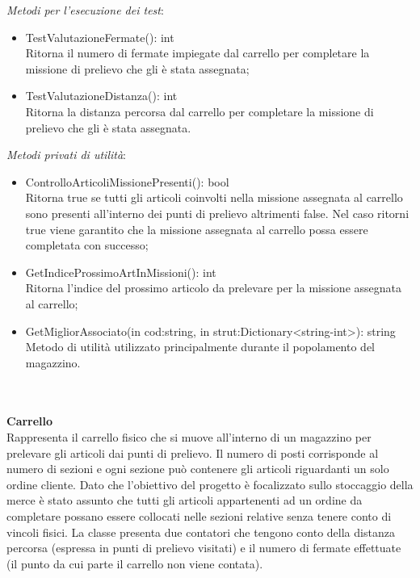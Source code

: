 \textit{Metodi per l'esecuzione dei test}:
\begin{itemize}
    \item TestValutazioneFermate(): int\\
    Ritorna il numero di fermate impiegate dal carrello per completare la missione di prelievo che gli è stata assegnata;
    \item TestValutazioneDistanza(): int\\
    Ritorna la distanza percorsa dal carrello per completare la missione di prelievo che gli è stata assegnata.\\
\end{itemize}
\textit{Metodi privati di utilità}:
\begin{itemize}
    \item ControlloArticoliMissionePresenti(): bool\\
    Ritorna true se tutti gli articoli coinvolti nella missione assegnata al carrello sono presenti all'interno dei punti di prelievo altrimenti false.
    Nel caso ritorni true viene garantito che la missione assegnata al carrello possa essere completata con successo;
    \item GetIndiceProssimoArtInMissioni(): int\\
    Ritorna l'indice del prossimo articolo da prelevare per la missione assegnata al carrello;
    \item GetMigliorAssociato(in cod:string, in strut:Dictionary<string-int>): string\\
    Metodo di utilità utilizzato principalmente durante il popolamento del magazzino.\\
\end{itemize}       
\\\\
\textbf{Carrello}
\\
Rappresenta il carrello fisico che si muove all'interno di un magazzino per prelevare gli articoli dai punti di prelievo.
Il numero di posti corrisponde al numero di sezioni e ogni sezione può contenere gli articoli riguardanti un solo ordine cliente.
Dato che l'obiettivo del progetto è focalizzato sullo stoccaggio della merce è stato assunto che tutti gli articoli appartenenti ad un ordine 
da completare possano essere collocati nelle sezioni relative senza tenere conto di vincoli fisici.
La classe presenta due contatori che tengono conto della distanza percorsa (espressa in punti di prelievo visitati) e il numero di fermate effettuate
(il punto da cui parte il carrello non viene contata).
\\\\
